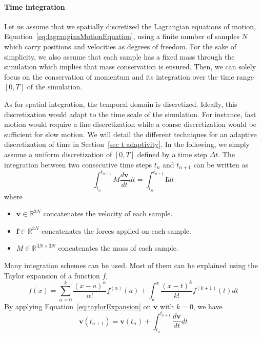 \paragraph{Time integration}
Let us assume that we spatially discretized the Lagrangian equations of motion, Equation~\eqref{eq:lagrangianMotionEquation}, using a finite number of samples $N$ which carry positions and velocities as degrees of freedom.
For the sake of simplicity, we also assume that each sample has a fixed mass through the simulation which implies that mass conservation is ensured. Then, we can solely focus on the conservation of momentum and its integration over the time range  $\left[0, T\right]$ of the simulation. 

As for spatial integration, the temporal domain is discretized. Ideally, this discretization would adapt to the time scale of the simulation. For instance, fast motion would require a fine discretization while a coarse discretization would be sufficient for slow motion. We will detail the different techniques for an adaptive discretization of time in Section~\ref{sec t adaptivity}.
In the following, we simply assume a uniform discretization of $\left[0,T\right]$ defined by a time step $\Delta t$. The integration between two consecutive time steps $t_{n}$ and $t_{n+1}$ can be written as
\begin{equation}
\label{eq:timeIntegration1}
\displaystyle
\int_{t_{n}}^{t_{n+1}}
M \frac{d\mathbf{v}}{dt} dt
=
\int_{t_{n}}^{t_{n+1}}\mathbf{f} dt
\end{equation}
where
\begin{itemize}
	\item $\mathbf{v} \in \mathbb{R}^{3N}$ concatenates the velocity of each sample.
	\item $\mathbf{f} \in \mathbb{R}^{3N}$ concatenates the forces applied on each sample.
	\item $M \in \mathbb{R}^{3N \times 3N}$ concatenates the mass of each sample.
\end{itemize}
Many integration schemes can be used. Most of them can be explained using the Taylor expansion of a function $f$,
\begin{equation}
\label{eq:taylorExpansion}
\displaystyle
f(x) = \sum_{\alpha=0}^{k}\frac{\left(x-a\right)^{\alpha}}{\alpha!}f^{(\alpha)}(a) + \int_{a}^{x}\frac{\left(x-t\right)^{k}}{k!}f^{(k+1)}(t)dt
\end{equation}
By applying Equation~\eqref{eq:taylorExpansion} on $\mathbf{v}$ with $k=0$, we have
\begin{equation}
\mathbf{v}(t_{n+1}) = \mathbf{v}(t_{n}) + \int_{t_{n}}^{t_{n+1}} \frac{d\mathbf{v}}{dt}dt
\end{equation}
